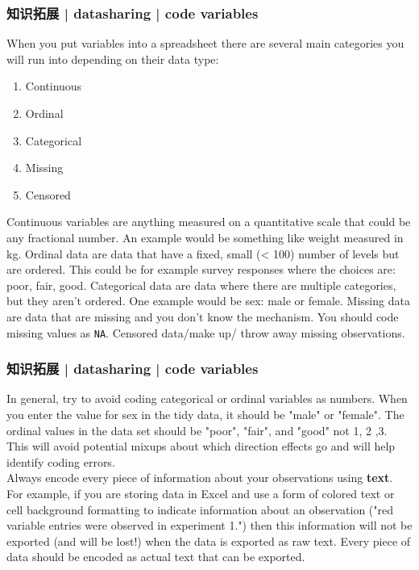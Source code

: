 \begin{frame}[fragile]
  \frametitle{知识拓展 | datasharing | code variables}
  When you put variables into a spreadsheet there are several main categories you will run into depending on their data type:
  \begin{enumerate}
    \item Continuous
    \item Ordinal
    \item Categorical
    \item Missing
    \item Censored
  \end{enumerate}

  Continuous variables are anything measured on a quantitative scale that could be any fractional number. An example would be something like weight measured in kg. Ordinal data are data that have a fixed, small (< 100) number of levels but are ordered. This could be for example survey responses where the choices are: poor, fair, good.  Categorical data are data where there are multiple categories, but they aren't ordered. One example would be sex: male or female. Missing data are data that are missing and you don't know the mechanism. You should code missing values as \verb|NA|.  Censored data/make up/ throw away missing observations.
\end{frame}

\begin{frame}
  \frametitle{知识拓展 | datasharing | code variables}
  In general, try to avoid coding categorical or ordinal variables as numbers. When you enter the value for sex in the tidy data, it should be "male" or "female". The ordinal values in the data set should be "poor", "fair", and "good" not 1, 2 ,3. This will avoid potential mixups about which direction effects go and will help identify coding errors.\\
  \vspace{1em}
  Always encode every piece of information about your observations using \textbf{text}. For example, if you are storing data in Excel and use a form of colored text or cell background formatting to indicate information about an observation ("red variable entries were observed in experiment 1.") then this information will not be exported (and will be lost!) when the data is exported as raw text. Every piece of data should be encoded as actual text that can be exported. 
\end{frame}


